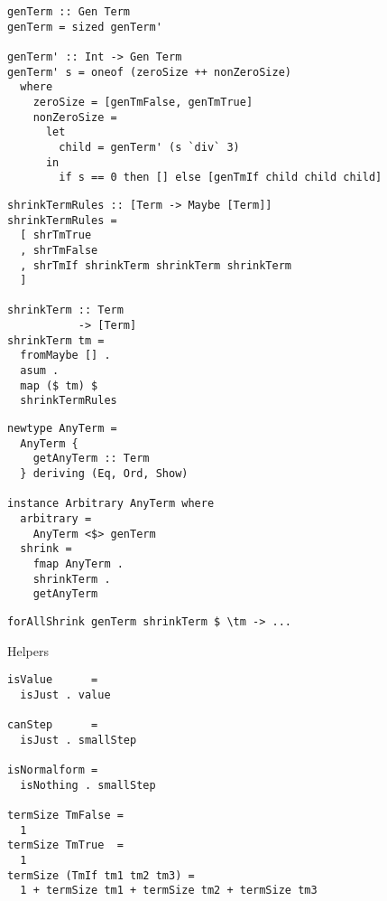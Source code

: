 \documentclass{beamer}
\begin{document}
\begin{frame}[fragile]
  \begin{verbatim}
genTerm :: Gen Term
genTerm = sized genTerm'

genTerm' :: Int -> Gen Term
genTerm' s = oneof (zeroSize ++ nonZeroSize)
  where
    zeroSize = [genTmFalse, genTmTrue]
    nonZeroSize = 
      let
        child = genTerm' (s `div` 3)
      in
        if s == 0 then [] else [genTmIf child child child]
  \end{verbatim}
\end{frame}

\begin{frame}[fragile]
  \begin{verbatim}
shrinkTermRules :: [Term -> Maybe [Term]] 
shrinkTermRules =
  [ shrTmTrue
  , shrTmFalse
  , shrTmIf shrinkTerm shrinkTerm shrinkTerm
  ]

shrinkTerm :: Term 
           -> [Term]
shrinkTerm tm =
  fromMaybe [] .
  asum .
  map ($ tm) $
  shrinkTermRules
  \end{verbatim}
\end{frame}

\begin{frame}[fragile]
  \begin{verbatim}
newtype AnyTerm = 
  AnyTerm { 
    getAnyTerm :: Term 
  } deriving (Eq, Ord, Show)
   
instance Arbitrary AnyTerm where 
  arbitrary = 
    AnyTerm <$> genTerm
  shrink = 
    fmap AnyTerm .
    shrinkTerm .
    getAnyTerm
  \end{verbatim}
\end{frame}

\begin{frame}[fragile]
  \begin{verbatim}
forAllShrink genTerm shrinkTerm $ \tm -> ...
  \end{verbatim}
\end{frame}

\begin{frame}[fragile]
Helpers
  \begin{verbatim}
isValue      = 
  isJust . value

canStep      =
  isJust . smallStep

isNormalform = 
  isNothing . smallStep

termSize TmFalse = 
  1
termSize TmTrue  =
  1
termSize (TmIf tm1 tm2 tm3) = 
  1 + termSize tm1 + termSize tm2 + termSize tm3
  \end{verbatim}
\end{frame}
\end{document}
